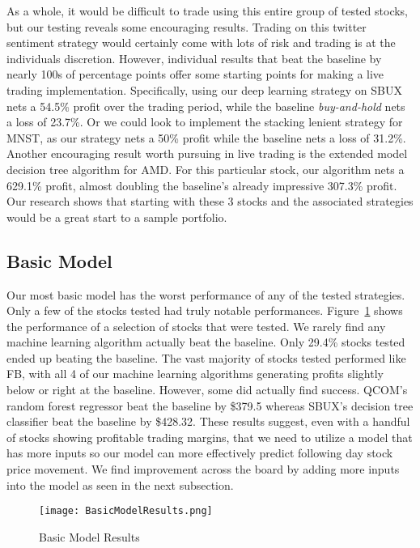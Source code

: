 \documentclass[../thesis.tex]{subfiles}
\begin{document}
As a whole, it would be difficult to trade using this entire group of tested stocks, but our testing reveals some encouraging results. Trading on this twitter sentiment strategy would certainly come with lots of risk and trading is at the individuals discretion. However, individual results that beat the baseline by nearly 100s of percentage points offer some starting points for making a live trading implementation. Specifically, using our deep learning strategy on SBUX nets a 54.5\% profit over the trading period, while the baseline \textit{buy-and-hold} nets a loss of 23.7\%. Or we could look to implement the stacking lenient strategy for MNST, as our strategy nets a 50\% profit while the baseline nets a loss of 31.2\%. Another encouraging result worth pursuing in live trading is the extended model decision tree algorithm for AMD. For this particular stock, our algorithm nets a 629.1\% profit, almost doubling the baseline's already impressive 307.3\% profit. Our research shows that starting with these 3 stocks and the associated strategies would be a great start to a sample portfolio.

\subsection{Basic Model}
Our most basic model has the worst performance of any of the tested strategies. Only a few of the stocks tested had truly notable performances. Figure~\ref{simpleresults} shows the performance of a selection of stocks that were tested. We rarely find any machine learning algorithm actually beat the baseline. Only 29.4\% stocks tested ended up beating the baseline. The vast majority of stocks tested performed like FB, with all 4 of our machine learning algorithms generating profits slightly below or right at the baseline. However, some did actually find success. QCOM's random forest regressor beat the baseline by \$379.5 whereas SBUX's decision tree classifier beat the baseline by \$428.32. These results suggest, even with a handful of stocks showing profitable trading margins, that we need to utilize a model that has more inputs so our model can more effectively predict following day stock price movement. We find improvement across the board by adding more inputs into the model as seen in the next subsection. 

\begin{figure}[h]
\centering
\texttt{[image: BasicModelResults.png]}
\caption{Basic Model Results \label{overflow}}
\label{simpleresults}
\end{figure}
\end{document}
